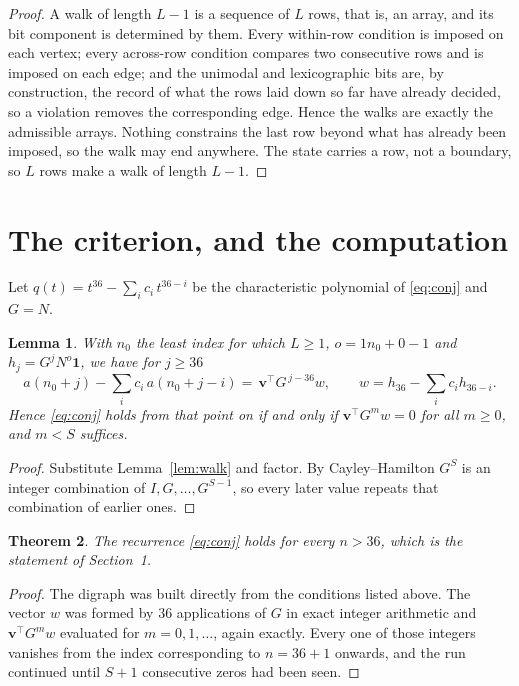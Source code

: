 \documentclass[11pt,a4paper]{article}
\theoremstyle{plain}
\newtheorem{theorem}{Theorem}
\newtheorem{lemma}[theorem]{Lemma}
\theoremstyle{definition}
\begin{document}
\begin{proof}
A walk of length $L-1$ is a sequence of $L$ rows, that is, an array, and its bit component
is determined by them. Every within-row condition is imposed on each vertex; every
across-row condition compares two consecutive rows and is imposed on each edge; and the
unimodal and lexicographic bits are, by construction, the record of what the rows laid down
so far have already decided, so a violation removes the corresponding edge. Hence the walks
are exactly the admissible arrays. Nothing constrains the last row beyond what has already
been imposed, so the walk may end anywhere. The state carries a row, not a boundary, so
$L$ rows make a walk of length $L-1$.
\end{proof}

\section{The criterion, and the computation}

Let $q(t)=t^{36}-\sum_i c_i\,t^{36-i}$ be the characteristic polynomial of
\eqref{eq:conj} and $G=N$.

\begin{lemma}\label{lem:crit}
With $n_0$ the least index for which $L\ge1$, $o=1n_0+0-1$ and
$h_j=G^{j}N^{o}\mathbf{1}$, we have for $j\ge36$
\[
a(n_0+j)-\sum_i c_i\,a(n_0+j-i)=\,\mathbf{v}^{\!\top}G^{\,j-36}w,
\qquad w=h_{36}-\sum_i c_ih_{36-i} .
\]
Hence \eqref{eq:conj} holds from that point on if and only if
$\mathbf{v}^{\!\top}G^{m}w=0$ for all $m\ge0$, and $m<S$ suffices.
\end{lemma}

\begin{proof}
Substitute Lemma~\ref{lem:walk} and factor. By Cayley--Hamilton $G^{S}$ is an integer
combination of $I,G,\dots,G^{S-1}$, so every later value repeats that combination of
earlier ones.
\end{proof}

\begin{theorem}
The recurrence \eqref{eq:conj} holds for every $n>36$, which is the statement of
Section~1.
\end{theorem}

\begin{proof}
The digraph was built directly from the conditions listed above. The vector $w$ was formed by
$36$ applications of $G$ in exact integer arithmetic and $\mathbf{v}^{\!\top}G^{m}w$
evaluated for $m=0,1,\dots$, again exactly. Every one of those integers vanishes from the
index corresponding to $n=36+1$ onwards, and the run continued until $S+1$ consecutive
zeros had been seen.
\end{proof}
\end{document}
